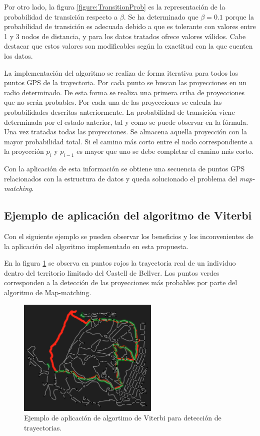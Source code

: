 Por otro lado, la figura \ref{figure:TransitionProb} es la representación de la probabilidad de 
transición respecto a $\beta$. Se ha determinado que $\beta = 0.1$ porque la 
probabilidad de transición es adecuada debido a que es tolerante con valores entre 1 y 3 nodos de 
distancia, y para los datos tratados ofrece valores válidos. Cabe destacar que estos valores son 
modificables según la exactitud con la que cuenten los datos.


La implementación del algoritmo se realiza de forma iterativa para todos los puntos \ac{GPS} de la 
trayectoria. Por cada punto se buscan las proyecciones en un radio determinado. De esta forma se 
realiza una primera criba de proyecciones que no serán probables.
Por cada una de las proyecciones se calcula las probabilidades descritas anteriormente. La 
probabilidad de transición viene determinada por el estado anterior, tal y como se puede observar en 
la fórmula. Una vez tratadas todas las proyecciones. Se almacena aquella proyección con la mayor 
probabilidad total. Si el camino más corto entre el nodo correspondiente a la proyección $p_{i}$ y 
$p_{i-1}$ es mayor que uno se debe completar el camino más corto. 

Con la aplicación de esta información se obtiene una secuencia de puntos \ac{GPS} relacionados 
con la estructura de datos y queda solucionado el problema del \textit{map-matching}.

\subsection{Ejemplo de aplicación del algoritmo de Viterbi}
Con el siguiente ejemplo se pueden observar los beneficios y los inconvenientes de la aplicación del algoritmo 
implementado en esta propuesta.

En la figura \ref{figure:MapMatching1} se observa en puntos rojos la trayectoria real de un individuo dentro del 
territorio limitado del Castell de Bellver. Los puntos verdes corresponden a la detección de las proyecciones 
más probables por parte del algoritmo de Map-matching.

\begin{figure}[htb]
\begin{center}
\includegraphics[width=0.6\textwidth]{./Imagenes/MapMatching1.png}
\caption{Ejemplo de aplicación de algortimo de Viterbi para detección de trayectorias.}
\label{figure:MapMatching1}
\end{center}
\end{figure}

